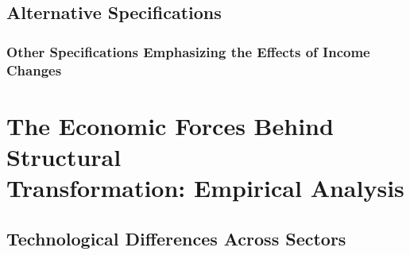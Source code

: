 \documentclass{article}
\begin{document}
    \subsection{Alternative Specifications}
    \subsubsection{Other Specifications Emphasizing the Effects of Income\\ Changes}
    \section{The Economic Forces Behind Structural\\ Transformation: Empirical Analysis}
    \subsection{Technological Differences Across Sectors}
\end{document}

